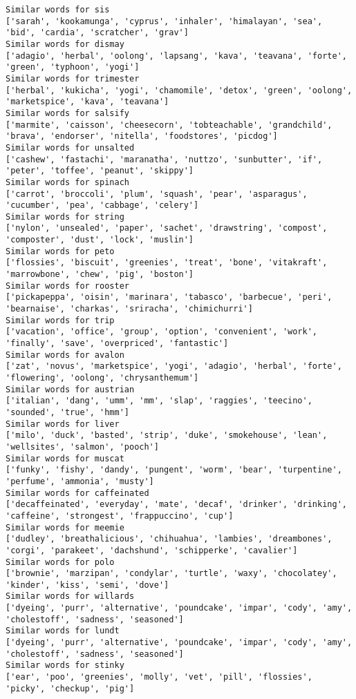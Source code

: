 \documentclass[11pt]{article}
\begin{document}
\begin{Verbatim}[commandchars=\\\{\}]
Similar words for sis
['sarah', 'kookamunga', 'cyprus', 'inhaler', 'himalayan', 'sea', 'bid', 'cardia', 'scratcher', 'grav']
Similar words for dismay
['adagio', 'herbal', 'oolong', 'lapsang', 'kava', 'teavana', 'forte', 'green', 'typhoon', 'yogi']
Similar words for trimester
['herbal', 'kukicha', 'yogi', 'chamomile', 'detox', 'green', 'oolong', 'marketspice', 'kava', 'teavana']
Similar words for salsify
['marmite', 'caisson', 'cheesecorn', 'tobteachable', 'grandchild', 'brava', 'endorser', 'nitella', 'foodstores', 'picdog']
Similar words for unsalted
['cashew', 'fastachi', 'maranatha', 'nuttzo', 'sunbutter', 'if', 'peter', 'toffee', 'peanut', 'skippy']
Similar words for spinach
['carrot', 'broccoli', 'plum', 'squash', 'pear', 'asparagus', 'cucumber', 'pea', 'cabbage', 'celery']
Similar words for string
['nylon', 'unsealed', 'paper', 'sachet', 'drawstring', 'compost', 'composter', 'dust', 'lock', 'muslin']
Similar words for peto
['flossies', 'biscuit', 'greenies', 'treat', 'bone', 'vitakraft', 'marrowbone', 'chew', 'pig', 'boston']
Similar words for rooster
['pickapeppa', 'oisin', 'marinara', 'tabasco', 'barbecue', 'peri', 'bearnaise', 'charkas', 'sriracha', 'chimichurri']
Similar words for trip
['vacation', 'office', 'group', 'option', 'convenient', 'work', 'finally', 'save', 'overpriced', 'fantastic']
Similar words for avalon
['zat', 'novus', 'marketspice', 'yogi', 'adagio', 'herbal', 'forte', 'flowering', 'oolong', 'chrysanthemum']
Similar words for austrian
['italian', 'dang', 'umm', 'mm', 'slap', 'raggies', 'teecino', 'sounded', 'true', 'hmm']
Similar words for liver
['milo', 'duck', 'basted', 'strip', 'duke', 'smokehouse', 'lean', 'wellsites', 'salmon', 'pooch']
Similar words for muscat
['funky', 'fishy', 'dandy', 'pungent', 'worm', 'bear', 'turpentine', 'perfume', 'ammonia', 'musty']
Similar words for caffeinated
['decaffeinated', 'everyday', 'mate', 'decaf', 'drinker', 'drinking', 'caffeine', 'strongest', 'frappuccino', 'cup']
Similar words for meemie
['dudley', 'breathalicious', 'chihuahua', 'lambies', 'dreambones', 'corgi', 'parakeet', 'dachshund', 'schipperke', 'cavalier']
Similar words for polo
['brownie', 'marzipan', 'condylar', 'turtle', 'waxy', 'chocolatey', 'kinder', 'kiss', 'semi', 'dove']
Similar words for willards
['dyeing', 'purr', 'alternative', 'poundcake', 'impar', 'cody', 'amy', 'cholestoff', 'sadness', 'seasoned']
Similar words for lundt
['dyeing', 'purr', 'alternative', 'poundcake', 'impar', 'cody', 'amy', 'cholestoff', 'sadness', 'seasoned']
Similar words for stinky
['ear', 'poo', 'greenies', 'molly', 'vet', 'pill', 'flossies', 'picky', 'checkup', 'pig']

\end{Verbatim}
\end{document}
